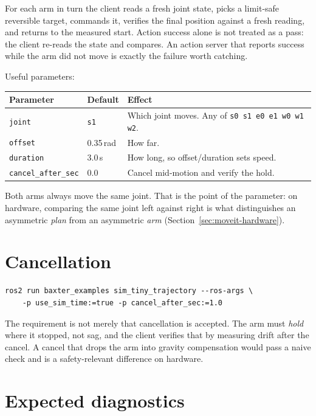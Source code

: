 For each arm in turn the client reads a fresh joint state, picks a limit-safe
reversible target, commands it, verifies the final position against a fresh
reading, and returns to the measured start. Action success alone is not treated
as a pass: the client re-reads the state and compares. An action server that
reports success while the arm did not move is exactly the failure worth catching.

Useful parameters:

\begin{table}[h]
\centering
\small
\begin{tabularx}{\linewidth}{@{}llX@{}}
\toprule
\textbf{Parameter} & \textbf{Default} & \textbf{Effect} \\
\midrule
\texttt{joint} & \texttt{s1} & Which joint moves. Any of \texttt{s0 s1 e0 e1 w0 w1 w2}. \\
\texttt{offset} & 0.35\,rad & How far. \\
\texttt{duration} & 3.0\,s & How long, so offset/duration sets speed. \\
\texttt{cancel\_after\_sec} & 0.0 & Cancel mid-motion and verify the hold. \\
\bottomrule
\end{tabularx}
\end{table}

Both arms always move the same joint. That is the point of the parameter: on
hardware, comparing the same joint left against right is what distinguishes an
asymmetric \emph{plan} from an asymmetric \emph{arm}
(Section~\ref{sec:moveit-hardware}).

\section{Cancellation}

\begin{lstlisting}
ros2 run baxter_examples sim_tiny_trajectory --ros-args \
    -p use_sim_time:=true -p cancel_after_sec:=1.0
\end{lstlisting}

The requirement is not merely that cancellation is accepted. The arm must
\emph{hold} where it stopped, not sag, and the client verifies that by measuring
drift after the cancel. A cancel that drops the arm into gravity compensation
would pass a naive check and is a safety-relevant difference on hardware.

\section{Expected diagnostics}

